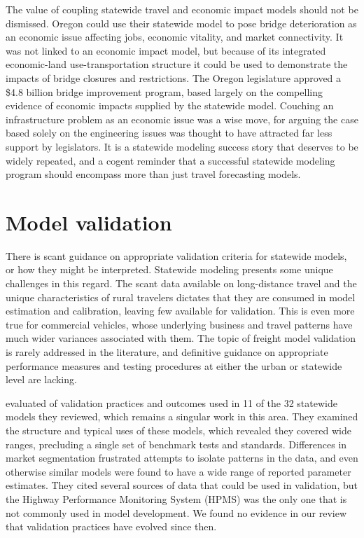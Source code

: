 The value of coupling statewide travel and economic impact models should not be dismissed. Oregon could use their statewide model to pose bridge deterioration as an economic issue affecting jobs, economic vitality, and market connectivity. It was not linked to an economic impact model, but because of its integrated economic-land use-transportation structure it could be used to demonstrate the impacts of bridge closures and restrictions. The Oregon legislature approved a \$4.8 billion bridge improvement program, based largely on the compelling evidence of economic impacts supplied by the statewide model. Couching an infrastructure problem as an economic issue was a wise move, for arguing the case based solely on the engineering issues was thought to have attracted far less support by legislators. It is a statewide modeling success story that deserves to be widely repeated, and a cogent reminder that a successful statewide modeling program should encompass more than just travel forecasting models.

\section{Model validation}

There is scant guidance on appropriate validation criteria for statewide models, or how they might be interpreted. Statewide modeling presents some unique challenges in this regard. The scant data available on long-distance travel and the unique characteristics of rural travelers dictates that they are consumed in model estimation and calibration, leaving few available for validation. This is even more true for commercial vehicles,  whose underlying business and travel patterns have much wider variances associated with them. The topic of freight model validation is rarely addressed in the literature, and definitive guidance on appropriate performance measures and testing procedures at either the urban or statewide level are lacking.

\cite{cambridge10} evaluated of validation practices and outcomes used in 11 of the 32 statewide models they reviewed, which remains a singular work in this area. They examined the structure and typical uses of these models, which revealed they covered wide ranges, precluding a single set of benchmark tests and standards. Differences in market segmentation frustrated attempts to isolate patterns in the data, and even otherwise similar models were found to have a wide range of reported parameter estimates. They cited several sources of data that could be used in validation, but the Highway Performance Monitoring System (HPMS) was the only one that is not commonly used in model development. We found no evidence in our review that validation practices have evolved since then.

